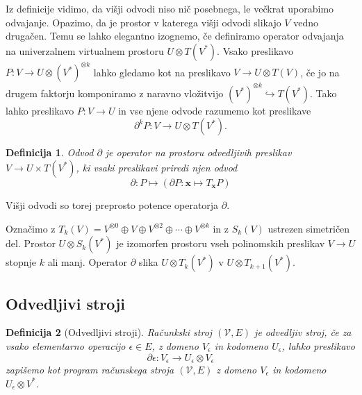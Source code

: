 \documentclass{article}
\newcommand{\VV}{\mathcal{V}}
\newcommand{\x}{\mathbf{x}}
\newcommand{\D}{\partial}
\newtheorem{definicija}{Definicija}[section]
\begin{document}
Iz definicije vidimo, da višji odvodi niso nič posebnega, le večkrat uporabimo
odvajanje. Opazimo, da je prostor v katerega višji odvodi slikajo $V$
vedno drugačen. Temu se lahko elegantno izognemo, če definiramo operator
odvajanja na univerzalnem virtualnem prostoru $U\otimes T(V^*)$. Vsako preslikavo $P:V\to U\otimes (V^*)^{\otimes k}$ lahko gledamo kot na
preslikavo $V\to U\otimes T(V)$, če jo na drugem faktorju komponiramo z naravno
vložitvijo $(V^*)^{\otimes k}\hookrightarrow T(V^*)$. Tako lahko preslikavo
$P:V\to U$ in vse njene odvode razumemo kot preslikave 
$$\D^k P:V\to U\otimes T(V^*).$$ 
\begin{definicija}\label{def:partial}
  Odvod
  $\D$ je operator na prostoru odvedljivih preslikav $V\to U\times T(V^*)$, ki
  vsaki preslikavi priredi njen odvod
  \begin{equation}
    \label{eq:odvod_splosen}
    \D : P \mapsto (\D P:\x\mapsto T_\x P)
  \end{equation}
\end{definicija}
Višji odvodi so torej preprosto potence operatorja $\D$.

Označimo z $T_k(V)=V^{\otimes 0}\oplus V \oplus V^{\otimes 2} \oplus \cdots
\oplus V^{\otimes k}$ in z $S_k(V)$ ustrezen simetričen del. Prostor $U\otimes
S_k(V^*)$ je izomorfen  prostoru vseh polinomskih preslikav $V\to U$ stopnje $k$
ali manj. Operator $\D$ slika $U\otimes T_k(V^*)$ v $U\otimes T_{k+1}(V^*)$.


\subsection{Odvedljivi stroji}

\begin{definicija}[Odvedljivi stroji]
  Računkski stroj $(\VV,E)$ je odvedljiv stroj, če za vsako elementarno operacijo
  $\epsilon\in E$, z domeno $V_\epsilon$ in kodomeno $U_\epsilon$, lahko preslikavo 
$$\D \epsilon:V_\epsilon\to U_\epsilon\otimes
V_\epsilon$$ 
zapišemo kot program računskega stroja $(\VV,E)$ z domeno $V_\epsilon$ in kodomeno
  $U_\epsilon \otimes V^*$. 
\end{definicija}
 
\end{document}
